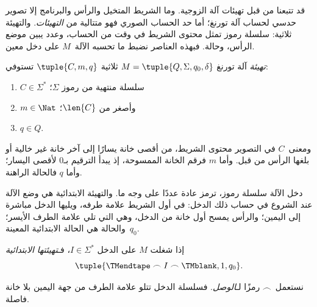 \documentclass[../../../include/open-logic-section]{subfiles}
\begin{document}

\begin{explain}
قد تتبعنا من قبل تهيئات آلة الزوجية. وما الشريط المتخيل والرأس والبرنامج إلا تصوير حدسي لحساب آلة تورنغ؛ أما حد الحساب الصوري فهو متتالية من \emph{التهيئات}. والتهيئة ثلاثية: سلسلة رموز تمثل محتوى الشريط في وقت من الحساب، وعدد يبين موضع الرأس، وحالة. فبهذه العناصر نضبط ما تحسبه الآلة~$M$ على دخل معين.
\end{explain}

\begin{defn}[التهيئة]
\emph{تهيئة} آلة تورنغ $M=\tuple{Q,\Sigma,q_0,\delta}$ ثلاثية $\tuple{C,m,q}$ تستوفي:
\begin{enumerate}
\item $C \in \Sigma^*$ سلسلة منتهية من رموز $\Sigma$؛
\item $m \in \Nat$ وأصغر من $\len{C}$؛
\item $q \in Q$.
\end{enumerate}
ومعنى~$C$ في التصوير محتوى الشريط، من أقصى خانة يسارًا إلى آخر خانة غير خالية أو بلغها الرأس من قبل. وأما $m$ فرقم الخانة الممسوحة، إذ يبدأ الترقيم بـ$0$ لأقصى اليسار؛ وأما $q$ فالحالة الراهنة.
\end{defn}

\begin{explain}
دخل الآلة سلسلة رموز، ترمز عادة عددًا على وجه ما. والتهيئة الابتدائية هي وضع الآلة عند الشروع في حساب ذلك الدخل: في أول الشريط علامة طرفه، ويليها الدخل مباشرة إلى اليمين؛ والرأس يمسح أول خانة من الدخل، وهي التي تلي علامة الطرف الأيسر؛ والحالة هي الحالة الابتدائية المعينة~$q_0$.
\end{explain}

\begin{defn}
إذا شغلت $M$ على الدخل $I \in \Sigma^*$، فـ\emph{تهيئتها الابتدائية}
\[
\tuple{\TMendtape \frown I \frown \TMblank, 1, q_0}.
\]
\end{defn}

\begin{explain}
نستعمل~$\frown$ رمزًا لـ\emph{الوصل}. فسلسلة الدخل تتلو علامة الطرف من جهة اليمين بلا خانة فاصلة.
\end{explain}
\end{document}
